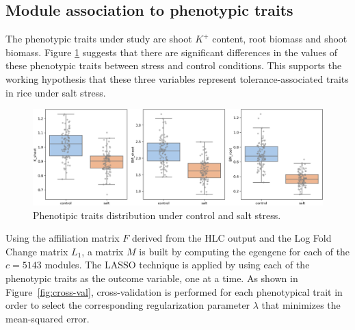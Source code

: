 \subsection{Module association to phenotypic traits}

The phenotypic traits under study are shoot $K^+$ content, root
biomass and shoot biomass. Figure \ref{fig:pdata} suggests that there
are significant differences in the values of these phenotypic traits
between stress and control conditions. This supports the working
hypothesis that these three variables represent tolerance-associated
traits in rice under salt stress.

\begin{figure}[htpb]
  \centering
    \includegraphics[clip,width=1\textwidth]{figures/phenotypic_traits.png}
  \caption{Phenotipic traits distribution under control and salt stress.}
  \label{fig:pdata}
\end{figure}

Using the affiliation matrix $F$ derived from the HLC output and the
Log Fold Change matrix $L_1$, a matrix $M$ is built by computing the
egengene for each of the $c = 5143$ modules. The LASSO technique is
applied by using each of the phenotypic traits as the outcome
variable, one at a time. As shown in Figure~\ref{fig:cross-val},
cross-validation is performed for each phenotypical trait in order to
select the corresponding regularization parameter $\lambda$ that
minimizes the mean-squared error.

